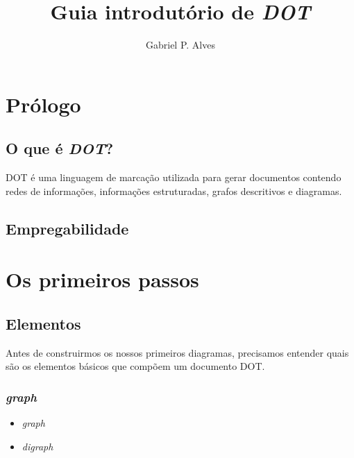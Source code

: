 \documentclass[a4paper,12pt]{article}
\begin{document}
  \title{\vspace{-0.5in} Guia introdutório de \emph{DOT}}
  \author{Gabriel P. Alves}
  \maketitle

  \section{Prólogo}

    \subsection{O que é \emph{DOT}?}
      DOT é uma linguagem de marcação utilizada para gerar
      documentos contendo redes de informações, informações
      estruturadas, grafos descritivos e diagramas.

    \subsection{Empregabilidade}
    \break

  \section{Os primeiros passos}

    \subsection{Elementos}
      Antes de construirmos os nossos primeiros diagramas,
      precisamos entender quais são os elementos básicos
      que compõem um documento DOT.

      \subsubsection{\emph{graph}}

        \begin{itemize}

          \item{\emph{graph}}

          \item{\emph{digraph}}

        \end{itemize}
\end{document}
